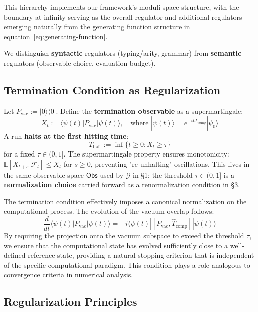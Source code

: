 This hierarchy implements our framework's moduli space structure, with the boundary at infinity serving as the overall regulator and additional regulators emerging naturally from the generating function structure in equation~\eqref{eq:generating-function}.

We distinguish \textbf{syntactic} regulators (typing/arity, grammar) from \textbf{semantic} regulators (observable choice, evaluation budget).

\subsection{Termination Condition as Regularization}

\begin{definition}
\label{def:termination-observable}
Let $P_{\mathrm{vac}}:=|0\rangle\langle 0|$. Define the \textbf{termination observable} as a supermartingale:
\[
X_t := \langle \psi(t)|P_{\mathrm{vac}}|\psi(t)\rangle, \quad \text{where } |\psi(t)\rangle=e^{-it\hat T_{\mathrm{comp}}}|\psi_0\rangle
\]
A run \textbf{halts at the first hitting time}:
\[
T_{\text{halt}} := \inf\{t \geq 0 : X_t \geq \tau\}
\]
for a fixed $\tau\in(0,1]$. The supermartingale property ensures monotonicity: $\mathbb{E}[X_{t+s}|\mathcal{F}_t] \leq X_t$ for $s \geq 0$, preventing "re-unhalting" oscillations. This lives in the same observable space $\mathsf{Obs}$ used by $\mathcal{G}$ in §1; the threshold $\tau\in(0,1]$ is a \textbf{normalization choice} carried forward as a renormalization condition in §3.
\end{definition}

The termination condition effectively imposes a canonical normalization on the computational process. The evolution of the vacuum overlap follows:
\[
\frac{d}{dt}\langle \psi(t)|P_{\mathrm{vac}}|\psi(t)\rangle = -i\langle \psi(t)|[P_{\mathrm{vac}}, \hat{T}_{\mathrm{comp}}]|\psi(t)\rangle
\]
By requiring the projection onto the vacuum subspace to exceed the threshold $\tau$, we ensure that the computational state has evolved sufficiently close to a well-defined reference state, providing a natural stopping criterion that is independent of the specific computational paradigm. This condition plays a role analogous to convergence criteria in numerical analysis.

\subsection{Regularization Principles}

